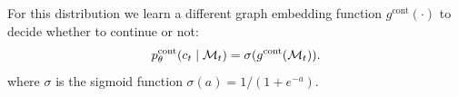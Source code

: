 For this distribution we learn a different graph embedding function $g^{\textrm{cont}}(\cdot)$ to decide whether to continue or not:
\begin{align}
p_\theta^\textrm{cont}(c_t \mid {\mathcal{M}}_t) = \sigma(g^{\textrm{cont}}({\mathcal{M}}_t)).
\end{align}
where $\sigma$ is the sigmoid function $\sigma(a) = 1/(1+e^{-a})$.






